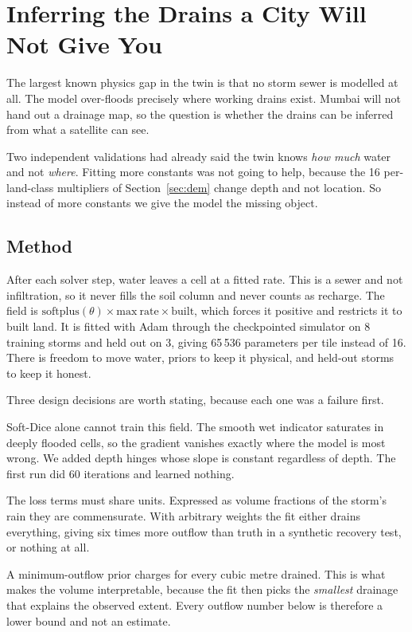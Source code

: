 \section{Inferring the Drains a City Will Not Give You}
\label{sec:sinkfield}

The largest known physics gap in the twin is that no storm sewer is modelled at all. The model
over-floods precisely where working drains exist. Mumbai will not hand out a drainage map, so the
question is whether the drains can be inferred from what a satellite can see.

Two independent validations had already said the twin knows \emph{how much} water and not
\emph{where}. Fitting more constants was not going to help, because the 16 per-land-class
multipliers of Section~\ref{sec:dem} change depth and not location. So instead of more constants we
give the model the missing object.

\subsection{Method}
After each solver step, water leaves a cell at a fitted rate. This is a sewer and not infiltration,
so it never fills the soil column and never counts as recharge. The field is
$\mathrm{softplus}(\theta) \times \mathrm{max\ rate} \times \mathrm{built}$, which forces it
positive and restricts it to built land. It is fitted with Adam through the checkpointed simulator
on 8 training storms and held out on 3, giving 65\,536 parameters per tile instead of 16. There is
freedom to move water, priors to keep it physical, and held-out storms to keep it honest.

Three design decisions are worth stating, because each one was a failure first.

Soft-Dice alone cannot train this field. The smooth wet indicator saturates in deeply flooded
cells, so the gradient vanishes exactly where the model is most wrong. We added depth hinges whose
slope is constant regardless of depth. The first run did 60 iterations and learned nothing.

The loss terms must share units. Expressed as volume fractions of the storm's rain they are
commensurate. With arbitrary weights the fit either drains everything, giving six times more
outflow than truth in a synthetic recovery test, or nothing at all.

A minimum-outflow prior charges for every cubic metre drained. This is what makes the volume
interpretable, because the fit then picks the \emph{smallest} drainage that explains the observed
extent. Every outflow number below is therefore a lower bound and not an estimate.

